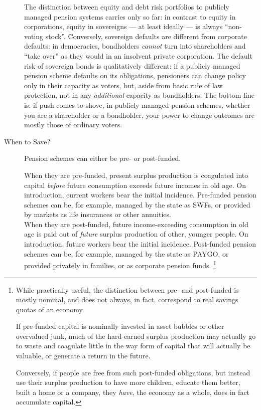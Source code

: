 \begin{description}
{		The distinction between equity and debt risk portfolios to publicly managed pension systems carries only so far:
		in contrast to equity in corporations, equity in sovereigns --- at least ideally --- is always ``non-voting stock''.
		Conversely, sovereign defaults are different from corporate defaults:
		in democracies, bondholders \emph{cannot} turn into shareholders and ``take over'' as they would in an insolvent private corporation.
		The default risk of sovereign bonds is qualitatively different:
		if a publicly managed pension scheme defaults on its obligations, pensioners can change policy only in their capacity as voters, but, aside from basic rule of law protection, not in any \emph{additional} capacity as bondholders.
		The bottom line is:
		if push comes to shove, in publicly managed pension schemes, whether you are a shareholder or a bondholder, your power to change outcomes are mostly those of ordinary voters.
	}
	\item[When to Save?]
	Pension schemes can either be pre- or post-funded.

	When they are pre-funded, present surplus production is coagulated into capital \emph{before} future consumption exceeds future incomes in old age.
	On introduction, current workers bear the initial incidence.
	Pre-funded pension schemes can be, for example, managed by the state as \glspl{SWF}, or provided by markets as life insurances or other annuities.\\
	When they are post-funded, future income-exceeding consumption in old age is paid out of \emph{future} surplus production of other, younger people.
	On introduction, future workers bear the initial incidence.
	Post-funded pension schemes can be, for example, managed by the state as PAYGO, or provided privately in families, or as corporate pension funds.
	\footnote{
		While practically useful, the distinction between pre- and post-funded is mostly nominal, and does not always, in fact, correspond to real savings quotas of an economy.

		If pre-funded capital is nominally invested in asset bubbles or other overvalued junk, much of the hard-earned surplus production may actually go to waste and coagulate little in the way form of capital that will actually be valuable, or generate a return in the future.

		Conversely, if people are free from such post-funded obligations, but instead use their surplus production to have more children, educate them better, built a home or a company, they \emph{have}, the economy as a whole, does in fact accumulate capital.

}
\end{description}
